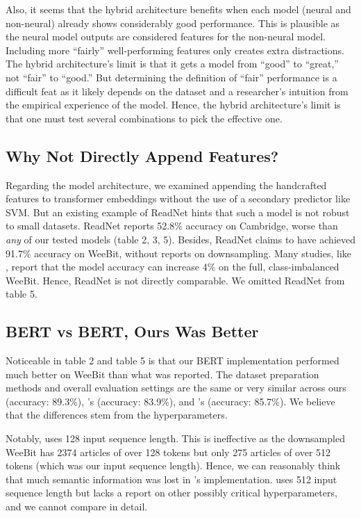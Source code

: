 \documentclass[11pt]{article}
\begin{document}
Also, it seems that the hybrid architecture benefits when each model (neural and non-neural) already shows considerably good performance. This is plausible as the neural model outputs are considered features for the non-neural model. Including more ``fairly'' well-performing features only creates extra distractions. The hybrid architecture's limit is that it gets a model from ``good'' to ``great,'' not ``fair'' to ``good.'' But determining the definition of ``fair'' performance is a difficult feat as it likely depends on the dataset and a researcher's intuition from the empirical experience of the model. Hence, the hybrid architecture's limit is that one must test several combinations to pick the effective one.

\subsection{Why Not Directly Append Features?}
Regarding the model architecture, we examined appending the handcrafted features to transformer embeddings without the use of a secondary predictor like SVM. But an existing example of ReadNet \citep{10.1007/978-3-030-45439-5_3} hints that such a model is not robust to small datasets. ReadNet reports 52.8\% accuracy on Cambridge, worse than \textit{any} of our tested models (table 2, 3, 5). Besides, ReadNet claims to have achieved 91.7\% accuracy on WeeBit, without reports on downsampling. Many studies, like \citet{deutsch-etal-2020-linguistic}, report that the model accuracy can increase 4\% on the full, class-imbalanced WeeBit. Hence, ReadNet is not directly comparable. We omitted ReadNet from table 5.

\subsection{BERT vs BERT, Ours Was Better}
Noticeable in table 2 and table 5 is that our BERT implementation performed much better on WeeBit than what was reported. The dataset preparation methods and overall evaluation settings are the same or very similar across ours (accuracy: 89.3\%), \citet{deutsch-etal-2020-linguistic}'s (accuracy: 83.9\%), and \citet{Martinc:21}'s (accuracy: 85.7\%). We believe that the differences stem from the hyperparameters. 

Notably, \citet{deutsch-etal-2020-linguistic} uses 128 input sequence length. This is ineffective as the downsampled WeeBit has 2374 articles of over 128 tokens but only 275 articles of over 512 tokens (which was our input sequence length). Hence, we can reasonably think that much semantic information was lost in \citet{deutsch-etal-2020-linguistic}'s implementation. \citet{Martinc:21} uses 512 input sequence length but lacks a report on other possibly critical hyperparameters, and we cannot compare in detail.
\end{document}
